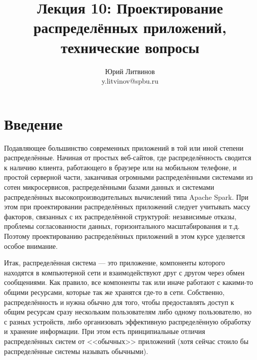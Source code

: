 \documentclass[a5paper]{article}
\title{Лекция 10: Проектирование распределённых приложений, технические вопросы}
\author{Юрий Литвинов\\\small{y.litvinov@spbu.ru}}
\date{}
\begin{document}
\maketitle
\thispagestyle{empty}

\section{Введение}

Подавляющее большинство современных приложений в той или иной степени распределённые. Начиная от простых веб-сайтов, где распределённость сводится к наличию клиента, работающего в браузере или на мобильном телефоне, и простой серверной части, заканчивая огромными распределёнными системами из сотен микросервисов, распределёнными базами данных и системами распределённых высокопроизводительных вычислений типа Apache Spark. При этом при проектировании распределённых приложений следует учитывать массу факторов, связанных с их распределённой структурой: независимые отказы, проблемы согласованности данных, горизонтального масштабирования и т.д. Поэтому проектированию распределённых приложений в этом курсе уделяется особое внимание.

Итак, распределённая система --- это приложение, компоненты которого находятся в компьютерной сети и взаимодействуют друг с другом через обмен сообщениями. Как правило, все компоненты так или иначе работают с какими-то общими ресурсами, которые так же хранятся где-то в сети. Собственно, распределённость и нужна обычно для того, чтобы предоставлять доступ к общим ресурсам сразу нескольким пользователям либо одному пользователю, но с разных устройств, либо организовать эффективную распределённую обработку и хранение информации. При этом есть принципиальные отличия распределённых систем от <<обычных>> приложений (хотя сейчас стоило бы распределённые системы называть обычными).
\end{document}
